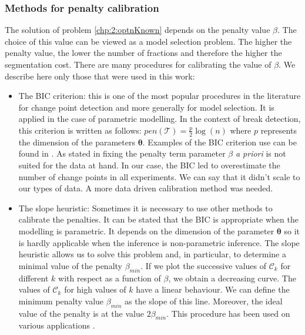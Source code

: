 \subsubsection{Methods for penalty calibration}

The solution of problem \ref{chp:2:optnKnown} depends on the penalty value $\beta$. The choice of this value can be viewed as a model selection problem. The higher the penalty value, the lower the number of fractions and therefore the higher the segmentation cost. There are many procedures for calibrating the value of $\beta$. We describe here only those that were used in this work: 

\begin{itemize}
  \item The BIC criterion: this is one of the most popular procedures in the literature for change point detection and more generally for model selection. It is applied in the case of parametric modelling. In the context of break detection, this criterion is written as follows: $pen(\mathcal{T}) = \frac{p}{2}\log(n)$ where $p$ represents the dimension of the parameters $\bm \theta$. Examples of the BIC criterion use can be found in \cite{YAO1988181,faure2016comparison,Shi2022}. As stated in \cite{faure2016comparison} fixing the penalty term parameter $\beta$ \textit{a priori} is not suited for the data at hand. In our case, the BIC led to overestimate the number of change points in all experiments. We can say that it didn't scale to our types of data. A more data driven calibration method was needed.    
  \item The slope heuristic: Sometimes it is necessary to use other methods to calibrate the penalties. It can be stated that the BIC is appropriate when the modelling is parametric. It depends on the dimension of the parameter $\bm \theta$ so it is hardly applicable when the inference is non-parametric inference. The slope heuristic \cite{Birge2006} allows us to solve this problem and, in particular, to determine a minimal value of the penalty $\beta_{min}$. If we plot the successive values of $\mathcal{C}_k$ for different $k$ with respect as a function of $\beta$, we obtain a decreasing curve. The values of $\mathcal{C}_k$ for high values of $k$ have a linear behaviour. We can define the minimum penalty value $\beta_{min}$ as the slope of this line. Moreover, the ideal value of the penalty is at the value $2\beta_{min}$. This procedure has been used on various applications \cite{Baudry2011,Bardet2012,arlot2009data}.
\end{itemize}


